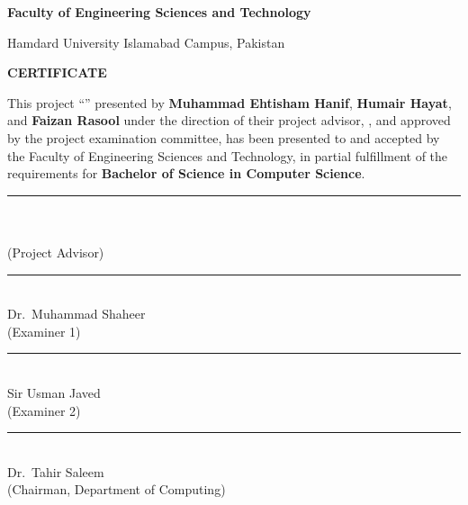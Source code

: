 \begin{titlepage}
    \begin{titlepagetext}
    \centering
    \vspace*{0.6cm}
    \hamdardlogosmall
    \vspace{0.6cm}

    {\large\bfseries Faculty of Engineering Sciences and Technology\par}
    {\large Hamdard University Islamabad Campus, Pakistan\par}
    \vspace{1cm}

    {\LARGE\bfseries CERTIFICATE\par}
    \vspace{1cm}

    \begin{minipage}{0.9\textwidth}
        \justifying
        \normalsize
        This project ``\reporttitle'' presented by \textbf{Muhammad Ehtisham Hanif}, \textbf{Humair Hayat}, and \textbf{Faizan Rasool} under the direction of their project advisor, \textbf{\supervisorname}, and approved by the project examination committee, has been presented to and accepted by the Faculty of Engineering Sciences and Technology, in partial fulfillment of the requirements for \textbf{Bachelor of Science in Computer Science}.
    \end{minipage}

    \vfill

    \begin{minipage}[t]{0.45\textwidth}
        \centering
        \rule{5.5cm}{0.4pt}\\[0.4em]
        \supervisorname\\[0.2em]
        (Project Advisor)
    \end{minipage}%
    \hfill
    \begin{minipage}[t]{0.45\textwidth}
        \centering
        \rule{5.5cm}{0.4pt}\\[0.4em]
        Dr.~Muhammad Shaheer\\[0.2em]
        (Examiner 1)
    \end{minipage}

    \vspace{1.2cm}

    \begin{minipage}[t]{0.45\textwidth}
        \centering
        \rule{5.5cm}{0.4pt}\\[0.4em]
        Sir Usman Javed\\[0.2em]
        (Examiner 2)
    \end{minipage}%
    \hfill
    \begin{minipage}[t]{0.45\textwidth}
        \centering
        \rule{5.5cm}{0.4pt}\\[0.4em]
        Dr.~Tahir Saleem\\[0.2em]
        (Chairman, Department of Computing)
    \end{minipage}


\end{titlepagetext}
\end{titlepage}
